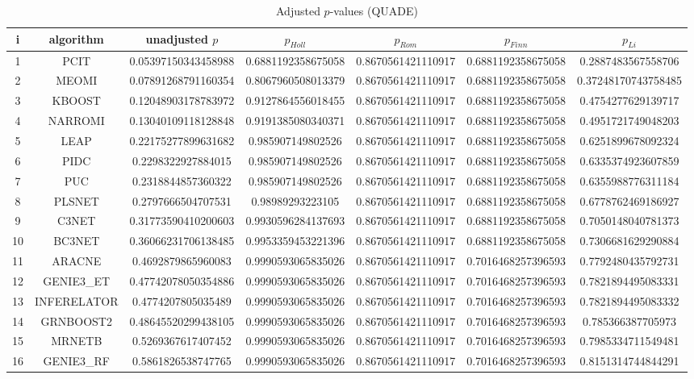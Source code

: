 \documentclass[a4paper,10pt]{article}
\begin{document}
\begin{landscape}
\begin{table}[!htp]
\centering\scriptsize
\caption{Adjusted $p$-values (QUADE)}
\begin{tabular}{ccccccc}
i&algorithm&unadjusted $p$&$p_{Holl}$&$p_{Rom}$&$p_{Finn}$&$p_{Li}$\\
\hline
1&PCIT&0.05397150343458988&0.6881192358675058&0.8670561421110917&0.6881192358675058&0.2887483567558706\\
2&MEOMI&0.07891268791160354&0.8067960508013379&0.8670561421110917&0.6881192358675058&0.37248170743758485\\
3&KBOOST&0.12048903178783972&0.9127864556018455&0.8670561421110917&0.6881192358675058&0.4754277629139717\\
4&NARROMI&0.13040109118128848&0.9191385080340371&0.8670561421110917&0.6881192358675058&0.4951721749048203\\
5&LEAP&0.22175277899631682&0.985907149802526&0.8670561421110917&0.6881192358675058&0.6251899678092324\\
6&PIDC&0.2298322927884015&0.985907149802526&0.8670561421110917&0.6881192358675058&0.6335374923607859\\
7&PUC&0.2318844857360322&0.985907149802526&0.8670561421110917&0.6881192358675058&0.6355988776311184\\
8&PLSNET&0.2797666504707531&0.98989293223105&0.8670561421110917&0.6881192358675058&0.6778762469186927\\
9&C3NET&0.31773590410200603&0.9930596284137693&0.8670561421110917&0.6881192358675058&0.7050148040781373\\
10&BC3NET&0.36066231706138485&0.9953359453221396&0.8670561421110917&0.6881192358675058&0.7306681629290884\\
11&ARACNE&0.4692879865960083&0.9990593065835026&0.8670561421110917&0.7016468257396593&0.7792480435792731\\
12&GENIE3_ET&0.47742078050354886&0.9990593065835026&0.8670561421110917&0.7016468257396593&0.7821894495083331\\
13&INFERELATOR&0.4774207805035489&0.9990593065835026&0.8670561421110917&0.7016468257396593&0.7821894495083332\\
14&GRNBOOST2&0.48645520299438105&0.9990593065835026&0.8670561421110917&0.7016468257396593&0.785366387705973\\
15&MRNETB&0.5269367617407452&0.9990593065835026&0.8670561421110917&0.7016468257396593&0.7985334711549481\\
16&GENIE3_RF&0.5861826538747765&0.9990593065835026&0.8670561421110917&0.7016468257396593&0.8151314744844291\\

\end{tabular}
\end{table}
\end{landscape}
\end{document}
